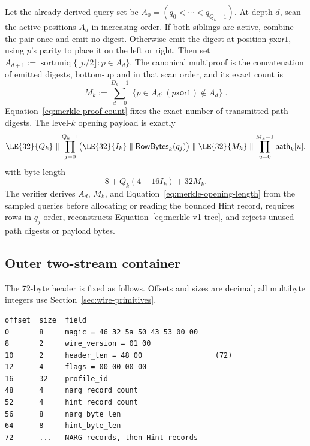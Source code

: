 Let the already-derived query set be
$A_0=(q_0<\cdots<q_{Q_k-1})$.  At depth $d$, scan the active positions $A_d$
in increasing order.  If both siblings are active, combine the pair once and
emit no digest.  Otherwise emit the digest at position
$p\mathbin{\mathsf{xor}}1$, using $p$'s parity to place it on the left or
right.  Then set
$A_{d+1}:=\operatorname{sortuniq}\{\lfloor p/2\rfloor:p\in A_d\}$.
The canonical multiproof is the concatenation of emitted digests, bottom-up
and in that scan order, and its exact count is
\begin{equation}
 M_k:=\sum_{d=0}^{D_k-1}
 \left|\{p\in A_d:(p\mathbin{\mathsf{xor}}1)\notin A_d\}\right|.
 \label{eq:merkle-proof-count}
\end{equation}
Equation~\eqref{eq:merkle-proof-count} fixes the exact number of transmitted
path digests.  The level-$k$ opening payload is exactly
\begin{equation}
 \LE{32}{Q_k}\parallel
 \prod_{j=0}^{Q_k-1}
   \bigl(\LE{32}{I_k}\parallel\mathsf{RowBytes}_k(q_j)\bigr)
 \parallel\LE{32}{M_k}\parallel
 \prod_{u=0}^{M_k-1}\mathsf{path}_k[u],
 \label{eq:merkle-opening-payload}
\end{equation}
with byte length
\begin{equation}
 8+Q_k(4+16I_k)+32M_k.
 \label{eq:merkle-opening-length}
\end{equation}
The verifier derives $A_d$, $M_k$, and
Equation~\eqref{eq:merkle-opening-length} from the sampled queries before
allocating or reading the bounded Hint record, requires rows in $q_j$ order,
reconstructs Equation~\eqref{eq:merkle-v1-tree}, and rejects unused path
digests or payload bytes.

\subsection{Outer two-stream container}
\label{sec:wire-container}

The 72-byte header is fixed as follows.  Offsets and sizes are decimal; all
multibyte integers use Section~\ref{sec:wire-primitives}.

\begin{lstlisting}[style=wire]
offset  size  field
0       8     magic = 46 32 5a 50 43 53 00 00
8       2     wire_version = 01 00
10      2     header_len = 48 00                 (72)
12      4     flags = 00 00 00 00
16      32    profile_id
48      4     narg_record_count
52      4     hint_record_count
56      8     narg_byte_len
64      8     hint_byte_len
72      ...   NARG records, then Hint records
\end{lstlisting}

